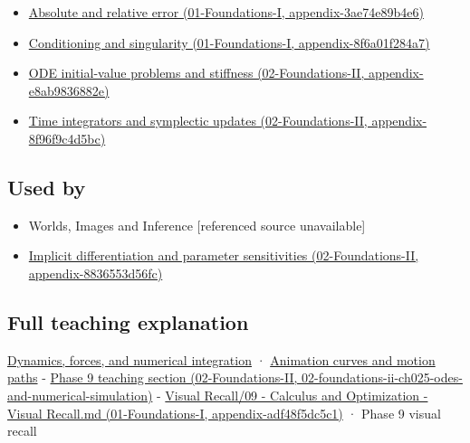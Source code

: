 \begin{itemize}
\tightlist
\item
  \href{../01-Foundations-I/main.pdf\#nameddest=appendix-3ae74e89b4e6}{Absolute and relative error (01-Foundations-I, appendix-3ae74e89b4e6)}
\item
  \href{../01-Foundations-I/main.pdf\#nameddest=appendix-8f6a01f284a7}{Conditioning and singularity (01-Foundations-I, appendix-8f6a01f284a7)}
\item
  \href{../02-Foundations-II/main.pdf\#nameddest=appendix-e8ab9836882e}{ODE initial-value problems and stiffness (02-Foundations-II, appendix-e8ab9836882e)}
\item
  \href{../02-Foundations-II/main.pdf\#nameddest=appendix-8f96f9c4d5bc}{Time integrators and symplectic updates (02-Foundations-II, appendix-8f96f9c4d5bc)}
\end{itemize}

\subsection{Used by}\label{appendix-18eacf61a04b-used-by}

\begin{itemize}
\tightlist
\item
  {Worlds, Images and Inference {[}referenced source unavailable{]}}
\item
  \href{../02-Foundations-II/main.pdf\#nameddest=appendix-8836553d56fc}{Implicit differentiation and parameter sensitivities (02-Foundations-II, appendix-8836553d56fc)}
\end{itemize}

\subsection{Full teaching explanation}\label{appendix-18eacf61a04b-full-teaching-explanation}

\hyperref[04-visual-computing-ii-ch029-dynamics-forces-and-numerical-integration]{Dynamics, forces, and numerical integration} · \hyperref[04-visual-computing-ii-ch029-animation-curves-and-motion-paths]{Animation curves and motion paths} - \href{../02-Foundations-II/main.pdf\#nameddest=02-foundations-ii-ch025-odes-and-numerical-simulation}{Phase 9 teaching section (02-Foundations-II, 02-foundations-ii-ch025-odes-and-numerical-simulation)} - \href{../01-Foundations-I/main.pdf\#nameddest=appendix-adf48f5dc5c1}{Visual Recall/09 - Calculus and Optimization - Visual Recall.md (01-Foundations-I, appendix-adf48f5dc5c1)} · Phase 9 visual recall
